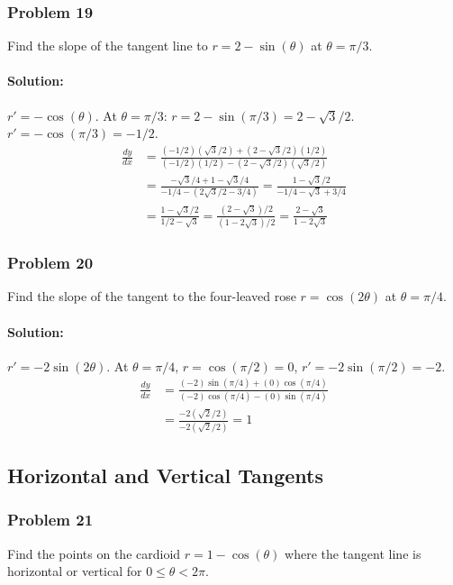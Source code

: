 \documentclass{article}
\begin{document}
\subsubsection*{Problem 19}
Find the slope of the tangent line to $r = 2 - \sin(\theta)$ at $\theta = \pi/3$.
\paragraph{Solution:}
$r' = -\cos(\theta)$.
At $\theta = \pi/3$: $r = 2-\sin(\pi/3) = 2-\sqrt{3}/2$. $r' = -\cos(\pi/3) = -1/2$.
\begin{align*} \frac{dy}{dx} &= \frac{(-1/2)(\sqrt{3}/2) + (2-\sqrt{3}/2)(1/2)}{(-1/2)(1/2) - (2-\sqrt{3}/2)(\sqrt{3}/2)} \\ &= \frac{-\sqrt{3}/4 + 1 - \sqrt{3}/4}{-1/4 - (2\sqrt{3}/2 - 3/4)} = \frac{1 - \sqrt{3}/2}{-1/4 - \sqrt{3} + 3/4} \\ &= \frac{1 - \sqrt{3}/2}{1/2 - \sqrt{3}} = \frac{(2-\sqrt{3})/2}{(1-2\sqrt{3})/2} = \frac{2-\sqrt{3}}{1-2\sqrt{3}} \end{align*}

\subsubsection*{Problem 20}
Find the slope of the tangent to the four-leaved rose $r=\cos(2\theta)$ at $\theta=\pi/4$.
\paragraph{Solution:}
$r' = -2\sin(2\theta)$.
At $\theta=\pi/4$, $r=\cos(\pi/2)=0$, $r'=-2\sin(\pi/2)=-2$.
\begin{align*} \frac{dy}{dx} &= \frac{(-2)\sin(\pi/4) + (0)\cos(\pi/4)}{(-2)\cos(\pi/4) - (0)\sin(\pi/4)} \\ &= \frac{-2(\sqrt{2}/2)}{-2(\sqrt{2}/2)} = 1 \end{align*}


\subsection*{Horizontal and Vertical Tangents}

\subsubsection*{Problem 21}
Find the points on the cardioid $r = 1 - \cos(\theta)$ where the tangent line is horizontal or vertical for $0 \le \theta < 2\pi$.
\end{document}
